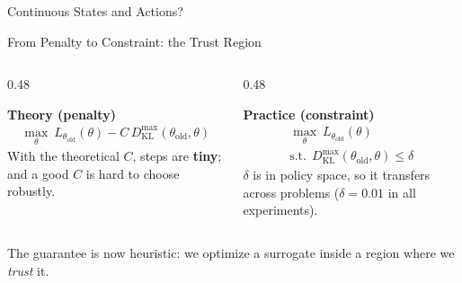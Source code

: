 \documentclass[aspectratio=169]{beamer}
\newcommand{\DKL}{D_{\mathrm{KL}}}
\newcommand{\told}{\theta_{\mathrm{old}}}
\begin{document}
\begin{frame}{Continuous States and Actions?}
\end{frame}

\begin{frame}{From Penalty to Constraint: the Trust Region}
  \begin{columns}[t]
    \begin{column}{0.48\textwidth}
      \begin{warmbox}
        \small\textbf{\color{AtlasWarm}Theory (penalty)}
        \begin{gather*}
          \max_\theta\ L_{\told}(\theta) - C\,\DKL^{\max}(\told,\theta)
        \end{gather*}
        With the theoretical $C$, steps are \textbf{tiny}; and a good $C$ is hard to choose robustly.
      \end{warmbox}
    \end{column}
    \begin{column}{0.48\textwidth}
      \begin{coolbox}
        \small\textbf{\color{AtlasCool}Practice (constraint)}
        \begin{gather*}
          \max_\theta\ L_{\told}(\theta) \\
          \text{s.t.}\ \ \DKL^{\max}(\told,\theta) \le \delta
        \end{gather*}
        $\delta$ is in policy space, so it transfers across problems ($\delta = 0.01$ in all experiments).
      \end{coolbox}
    \end{column}
  \end{columns}

  \vspace{8pt}
  \begin{noteframe}
    \small The guarantee is now heuristic: we optimize a surrogate inside a region where we \emph{trust} it.
  \end{noteframe}
\end{frame}
\end{document}
